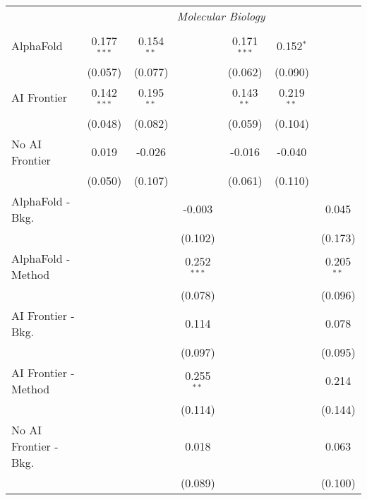 \begin{tabular}{lcccccc}
 & \multicolumn{6}{c}{\textit{Molecular Biology}} \\ \\
   AlphaFold               & 0.177$^{***}$ & 0.154$^{**}$ &               & 0.171$^{***}$ & 0.152$^{*}$  &   \\   
                           & (0.057)       & (0.077)      &               & (0.062)       & (0.090)      &   \\   
   AI Frontier             & 0.142$^{***}$ & 0.195$^{**}$ &               & 0.143$^{**}$  & 0.219$^{**}$ &   \\   
                           & (0.048)       & (0.082)      &               & (0.059)       & (0.104)      &   \\   
   No AI Frontier          & 0.019         & -0.026       &               & -0.016        & -0.040       &   \\   
                           & (0.050)       & (0.107)      &               & (0.061)       & (0.110)      &   \\   
   AlphaFold - Bkg.        &               &              & -0.003        &               &              & 0.045\\   
                           &               &              & (0.102)       &               &              & (0.173)\\   
   AlphaFold - Method      &               &              & 0.252$^{***}$ &               &              & 0.205$^{**}$\\   
                           &               &              & (0.078)       &               &              & (0.096)\\   
   AI Frontier - Bkg.      &               &              & 0.114         &               &              & 0.078\\   
                           &               &              & (0.097)       &               &              & (0.095)\\   
   AI Frontier - Method    &               &              & 0.255$^{**}$  &               &              & 0.214\\   
                           &               &              & (0.114)       &               &              & (0.144)\\   
   No AI Frontier - Bkg.   &               &              & 0.018         &               &              & 0.063\\   
                           &               &              & (0.089)       &               &              & (0.100)\\   

\end{tabular}
